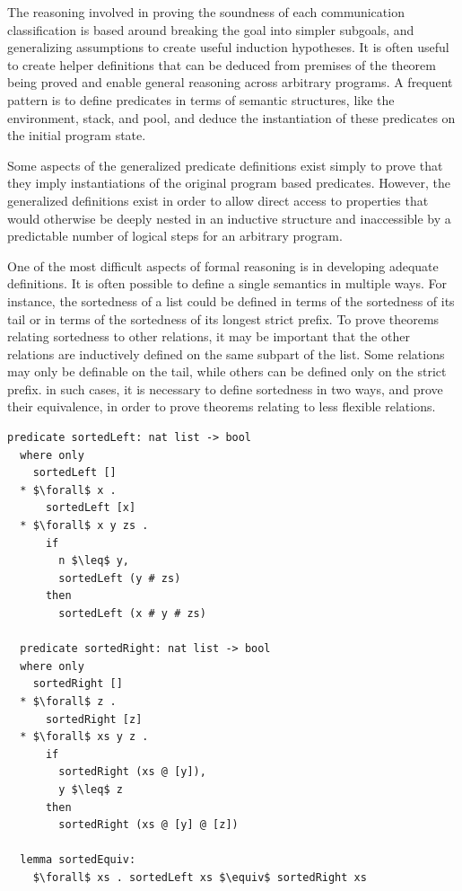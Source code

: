 \documentclass[letterpaper, 11pt]{extarticle}
\begin{document}
The reasoning involved in proving the soundness of each communication classification
is based around breaking the goal into simpler subgoals, and generalizing assumptions to create
useful induction hypotheses.  It is often useful to
create helper definitions that can be deduced
from premises of the theorem being proved and enable
general reasoning across arbitrary programs.
A frequent pattern is to define
predicates in terms of semantic structures, like the environment, stack, and pool, and deduce 
the instantiation of these predicates on the initial program state. 

Some aspects of the generalized predicate definitions exist simply to prove that they imply
instantiations of the original program based predicates. However, the generalized
definitions exist in order to allow direct access to properties that would
otherwise be deeply nested
in an inductive structure and inaccessible by a predictable number of
logical steps for an arbitrary
program.

One of the most difficult aspects of formal reasoning is in developing adequate definitions.
It is often possible to define a single semantics in multiple ways.
For instance, the sortedness of a list could be defined in terms of the sortedness of its tail
or in terms of the sortedness of its longest strict prefix. To prove theorems relating
sortedness to other relations, it may be important that the other relations are inductively
defined on the same subpart of the list. Some relations may only be definable on the tail,
while others can be defined only on the strict prefix. in such cases, it is necessary to
define sortedness in two ways, and prove their equivalence, in order to prove theorems relating
to less flexible relations.

\begin{lstlisting}[language=logic, mathescape]
  predicate sortedLeft: nat list -> bool
  where only
    sortedLeft []
  * $\forall$ x .
      sortedLeft [x]
  * $\forall$ x y zs .
      if 
        n $\leq$ y,
        sortedLeft (y # zs)
      then
        sortedLeft (x # y # zs)

  predicate sortedRight: nat list -> bool
  where only
    sortedRight []
  * $\forall$ z .
      sortedRight [z]
  * $\forall$ xs y z .
      if 
        sortedRight (xs @ [y]),
        y $\leq$ z 
      then
        sortedRight (xs @ [y] @ [z])

  lemma sortedEquiv:
    $\forall$ xs . sortedLeft xs $\equiv$ sortedRight xs  
\end{lstlisting}
\end{document}

